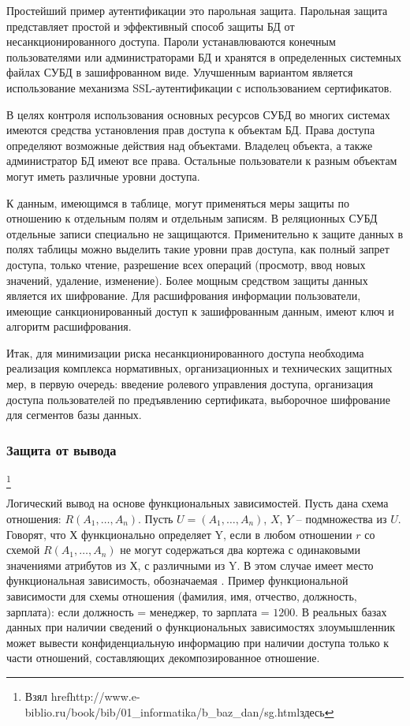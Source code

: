 Простейший пример аутентификации это парольная защита. Парольная защита представляет простой и эффективный способ защиты БД от несанкционированного доступа. Пароли устанавлюваются конечным пользователями или администраторами БД и хранятся в определенных системных файлах СУБД в зашифрованном виде. Улучшенным вариантом является использование механизма SSL-аутентификации с использованием сертификатов.

В целях контроля использования основных ресурсов СУБД во многих системах имеются средства установления прав доступа к объектам БД. Права доступа определяют возможные действия над объектами. Владелец объекта, а также администратор БД имеют все права. Остальные пользователи к разным объектам могут иметь различные уровни доступа.

К данным, имеющимся в таблице, могут применяться меры защиты по отношению к отдельным полям и отдельным записям. В реляционных СУБД отдельные записи специально не защищаются. Применительно к защите данных в полях таблицы можно выделить такие уровни прав доступа, как полный запрет доступа, только чтение, разрешение всех операций (просмотр, ввод новых значений, удаление, изменение). Более мощным средством защиты данных является их шифрование. Для расшифрования информации пользователи, имеющие санкционированный доступ к зашифрованным данным, имеют ключ и алгоритм расшифрования.

Итак, для минимизации риска несанкционированного доступа необходима реализация комплекса нормативных, организационных и технических защитных мер, в первую очередь: введение ролевого управления доступа, организация доступа пользователей по предъявлению сертификата, выборочное шифрование для сегментов базы данных.

\subsubsection{Защита от вывода}\footnote{Взял href{http://www.e-biblio.ru/book/bib/01\_informatika/b\_baz\_dan/sg.html}{здесь}}

Логический вывод на основе функциональных зависимостей. Пусть дана схема отношения: $R(A_1, \ldots, A_n)$. Пусть $U = (A_1, \ldots, A_n)$, $X$, $Y$ -- подмножества из $U$. Говорят, что Х функционально определяет Y, если в любом отношении $r$ со схемой $R(A_1, \ldots, A_n)$ не могут содержаться два кортежа с одинаковыми значениями атрибутов из Х, с различными из Y. В этом случае имеет место функциональная зависимость, обозначаемая . Пример функциональной зависимости для схемы отношения (фамилия, имя, отчество, должность, зарплата): если должность = менеджер, то зарплата = $1200$. В реальных базах данных при наличии сведений о функциональных зависимостях злоумышленник может вывести конфиденциальную информацию при наличии доступа только к части отношений, составляющих декомпозированное отношение.

